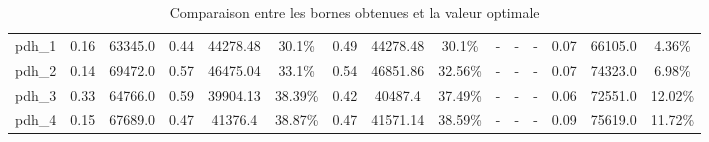 \documentclass[main.tex]{subfiles}
\begin{document}
\begin{landscape}
\begin{table}[h]
{\begin{tabular}{c|cc|ccc|ccc|ccc|ccc}
	pdh\_1 &0.16 &63345.0 &0.44 &44278.48 &30.1\% &0.49 &44278.48 &30.1\% &- &- &- &0.07 &66105.0 &4.36\%\\
	pdh\_2 &0.14 &69472.0 &0.57 &46475.04 &33.1\% &0.54 &46851.86 &32.56\% &- &- &- &0.07 &74323.0 &6.98\%\\
	pdh\_3 &0.33 &64766.0 &0.59 &39904.13 &38.39\% &0.42 &40487.4 &37.49\% &- &- &- &0.06 &72551.0 &12.02\%\\
	pdh\_4 &0.15 &67689.0 &0.47 &41376.4 &38.87\% &0.47 &41571.14 &38.59\% &- &- &- &0.09 &75619.0 &11.72\%\\
    \end{tabular}
}
\caption{Comparaison entre les bornes obtenues et la valeur optimale}
\end{table}
\end{landscape}
\newpage
\thispagestyle{empty}
\begin{landscape}
\begin{table}[h]
    \centering
{}
\end{table}
\end{landscape}
\end{document}
